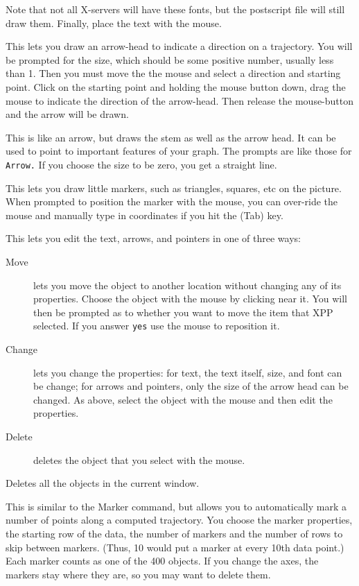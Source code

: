 \documentclass{article}
\begin{document}
\begin{description}
\begin{description}
Note that not all X-servers will have these fonts, but the
postscript file will still draw them. Finally, place the text with the
mouse.
\item[Arrow] This lets you draw an arrow-head to indicate a direction
on a trajectory.  You will be prompted for the size, which should be
some positive number, usually less than 1.  Then you must move the the
mouse and select a direction and starting point.  Click on the
starting point and holding the mouse button down, drag the mouse to
indicate the direction of the arrow-head. Then release the
mouse-button and the arrow will be drawn.  
\item[Pointer] This is like an arrow, but draws the stem as well as
the arrow head.  It can be used to point to important features of your
graph. The prompts are like those for {\tt Arrow.}  If you choose the size to be zero, you get a straight line.
\item[Marker] This lets you draw little markers, such as triangles,
squares, etc on the picture. When prompted to position the marker with
the mouse, you can over-ride the mouse and manually type in
coordinates if you hit the (Tab) key.
\item[Edit] This lets you edit the text, arrows, and pointers in one of
three ways:
\begin{description}
\item[Move] lets you move the object to another location without
changing any of its properties.  Choose the object with the mouse by
clicking near it.
You will then be prompted as to whether you want to move the item that
XPP selected.  If you answer {\tt yes} use the mouse to reposition it.
\item[Change] lets you change the properties: for text, the text
itself, size, and font can be change; for arrows and pointers, only
the size of the arrow head can be changed. As above, select the object
with the mouse and then edit the properties.
\item[Delete] deletes the object that you select with the mouse.
\end{description}
\item[(D)elete All] Deletes all the objects in the current window.
\item[marker(S)] This is similar to the Marker command, but allows you to
automatically mark a number of points along a computed trajectory. You
choose the marker properties, the starting row of the data, the number of markers and the number of
rows to skip between markers.  (Thus, 10 would
put a marker at every 10th data point.)  Each marker counts as one of the 400 objects.  If you change the
axes, the markers stay where they are, so you may want to delete them. 




\end{description}
\end{description}
\end{document}
